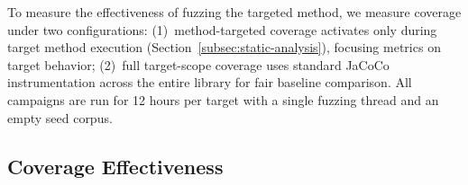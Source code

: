 \par
To measure the effectiveness of fuzzing the targeted method, we measure coverage under two configurations: (1)~method-targeted coverage activates only during target method execution (Section~\ref{subsec:static-analysis}), focusing metrics on target behavior; (2)~full target-scope coverage uses standard JaCoCo instrumentation across the entire library for fair baseline comparison.
All campaigns are run for 12 hours per target with a single fuzzing thread and an empty seed corpus. 
\subsection{Coverage Effectiveness}%
\label{subsec:coverage-effectiveness}



